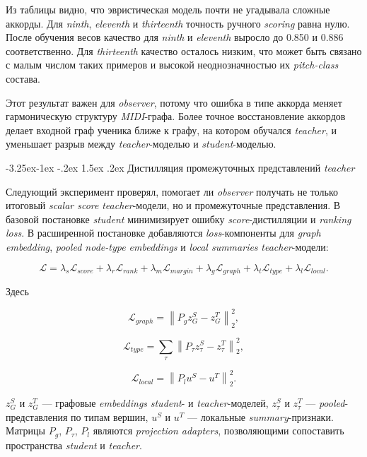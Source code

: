 \documentclass[a4paper,12pt]{extarticle}
\makeatletter
\renewcommand\subsubsection{\@startsection{subsubsection}{3}{\z@}%
  {-3.25ex\@plus -1ex \@minus -.2ex}%
  {1.5ex \@plus .2ex}%
  {\normalfont\normalsize\bfseries\Needspace{5\baselineskip}}}
\makeatother
\begin{document}
Из таблицы видно, что эвристическая модель почти не угадывала сложные аккорды. Для \textit{ninth}, \textit{eleventh} и \textit{thirteenth} точность ручного \textit{scoring} равна нулю. После обучения весов качество для \textit{ninth} и \textit{eleventh} выросло до 0.850 и 0.886 соответственно. Для \textit{thirteenth} качество осталось низким, что может быть связано с малым числом таких примеров и высокой неоднозначностью их \textit{pitch-class} состава.

Этот результат важен для \textit{observer}, потому что ошибка в типе аккорда меняет гармоническую структуру \textit{MIDI}-графа. Более точное восстановление аккордов делает входной граф ученика ближе к графу, на котором обучался \textit{teacher}, и уменьшает разрыв между \textit{teacher}-моделью и \textit{student}-моделью.

\subsubsection{Дистилляция промежуточных представлений \textit{teacher}}

Следующий эксперимент проверял, помогает ли \textit{observer} получать не только итоговый \textit{scalar score} \textit{teacher}-модели, но и промежуточные представления. В базовой постановке \textit{student} минимизирует ошибку \textit{score}-дистилляции и \textit{ranking loss}. В расширенной постановке добавляются \textit{loss}-компоненты для \textit{graph embedding}, \textit{pooled node-type embeddings} и \textit{local summaries} \textit{teacher}-модели:

\[
\mathcal{L}
=
\lambda_s \mathcal{L}_{score}
+
\lambda_r \mathcal{L}_{rank}
+
\lambda_m \mathcal{L}_{margin}
+
\lambda_g \mathcal{L}_{graph}
+
\lambda_t \mathcal{L}_{type}
+
\lambda_l \mathcal{L}_{local}.
\]

Здесь

\[
\mathcal{L}_{graph}
=
\left\|
P_g z_G^{S} - z_G^{T}
\right\|_2^2,
\]

\[
\mathcal{L}_{type}
=
\sum_{\tau}
\left\|
P_\tau z_{\tau}^{S} - z_{\tau}^{T}
\right\|_2^2,
\]

\[
\mathcal{L}_{local}
=
\left\|
P_l u^{S} - u^{T}
\right\|_2^2.
\]

$z_G^{S}$ и $z_G^{T}$ --- графовые \textit{embeddings} \textit{student}- и \textit{teacher}-моделей, $z_{\tau}^{S}$ и $z_{\tau}^{T}$ --- \textit{pooled}-представления по типам вершин, $u^{S}$ и $u^{T}$ --- локальные \textit{summary}-признаки. Матрицы $P_g$, $P_\tau$, $P_l$ являются \textit{projection adapters}, позволяющими сопоставить пространства \textit{student} и \textit{teacher}.
\end{document}
